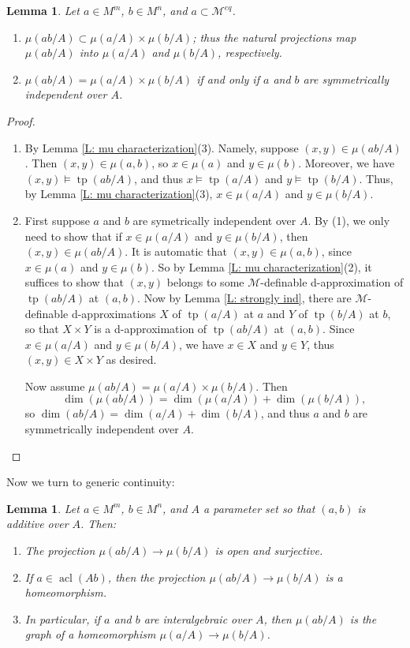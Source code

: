 \documentclass{amsart}
\newtheorem{lemma}[theorem]{Lemma}
\theoremstyle{definition}
\newcommand{\acl}{\operatorname{acl}}
\newcommand{\tp}{\operatorname{tp}}
\begin{document}
    \begin{lemma}\label{L: mu strong ind} Let $a\in M^m$, $b\in M^n$, and $a\subset\mathcal M^{eq}$.
    \begin{enumerate}
    \item $\mu(ab/A)\subset\mu(a/A)\times\mu(b/A)$; thus the natural projections map $\mu(ab/A)$ into $\mu(a/A)$ and $\mu(b/A)$, respectively. 
    \item $\mu(ab/A)=\mu(a/A)\times\mu(b/A)$ if and only if $a$ and $b$ are symmetrically independent over $A$.
\end{enumerate}
\end{lemma}

\begin{proof}
    \begin{enumerate}
        \item By Lemma \ref{L: mu characterization}(3). Namely, suppose $(x,y)\in\mu(ab/A)$. Then $(x,y)\in\mu(a,b)$, so $x\in\mu(a)$ and $y\in\mu(b)$. Moreover, we have $(x,y)\models\tp(ab/A)$, and thus $x\models\tp(a/A)$ and $y\models\tp(b/A)$. Thus, by Lemma \ref{L: mu characterization}(3), $x\in\mu(a/A)$ and $y\in\mu(b/A)$.
        \item First suppose $a$ and $b$ are symetrically independent over $A$. By (1), we only need to show that if $x\in\mu(a/A)$ and $y\in\mu(b/A)$, then $(x,y)\in\mu(ab/A)$. It is automatic that $(x,y)\in\mu(a,b)$, since $x\in\mu(a)$ and $y\in\mu(b)$. So by Lemma \ref{L: mu characterization}(2), it suffices to show that $(x,y)$ belongs to some $\mathcal M$-definable d-approximation of $\tp(ab/A)$ at $(a,b)$. Now by Lemma \ref{L: strongly ind}, there are $\mathcal M$-definable d-approximations $X$ of $\tp(a/A)$ at $a$ and $Y$ of $\tp(b/A)$ at $b$, so that $X\times Y$ is a d-approximation of $\tp(ab/A)$ at $(a,b)$. Since $x\in\mu(a/A)$ and $y\in \mu(b/A)$, we have $x\in X$ and $y\in Y$, thus $(x,y)\in X\times Y$ as desired.

        Now assume $\mu(ab/A)=\mu(a/A)\times\mu(b/A)$. Then $$\dim(\mu(ab/A))=\dim(\mu(a/A))+\dim(\mu(b/A)),$$ so $\dim(ab/A)=\dim(a/A)+\dim(b/A)$, and thus $a$ and $b$ are symmetrically independent over $A$.
    \end{enumerate}
\end{proof}

Now we turn to generic continuity:

\begin{lemma}\label{L: mu generic cont}
    Let $a\in M^m$, $b\in M^n$, and $A$ a parameter set so that $(a,b)$ is additive over $A$. Then: 
    \begin{enumerate}
        \item The projection $\mu(ab/A)\rightarrow\mu(b/A)$ is open and surjective.
        \item If $a\in\acl(Ab)$, then the projection $\mu(ab/A)\rightarrow\mu(b/A)$ is a homeomorphism.
        \item In particular, if $a$ and $b$ are interalgebraic over $A$, then $\mu(ab/A)$ is the graph of a homeomorphism $\mu(a/A)\rightarrow\mu(b/A)$.
    \end{enumerate}
\end{lemma}
\end{document}

